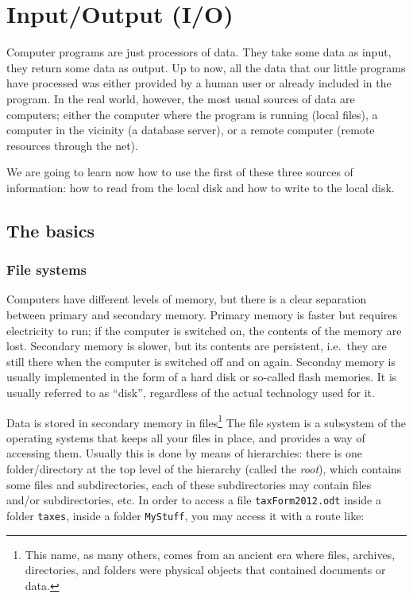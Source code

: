 
\section{Input/Output (I/O)}
\label{sec:inputoutput-io}

Computer programs are just processors of data. They take some data as
input, they return some data as output. Up to now, all the data that
our little programs have processed was either provided by a human user
or already included in the program. In the real world, however, the
most usual sources of data are computers; either the computer where
the program is running (local files), a computer in the vicinity (a
database server), or a remote computer (remote resources through the
net). 

We are going to learn now how to use the first of these three sources
of information: how to read from the local disk and how to write to
the local disk. 

\subsection{The basics}
\label{sec:basics}

\subsubsection{File systems}
\label{sec:filesystems}

Computers have different levels of memory, but there is a clear
separation between primary and secondary memory. Primary memory is
faster but requires electricity to run; if the computer is switched
on, the contents of the memory are lost. Secondary memory is slower,
but its contents are persistent, i.e.~they are still there when the
computer is switched off and on again. Seconday memory is usually
implemented in the form of a hard disk or so-called flash
memories. It is usually referred to as ``disk'', regardless of the
actual technology used for it. 

Data is stored in secondary memory in files\footnote{This name, as
  many others, comes from an ancient era where files, archives,
  directories, and folders were physical objects that contained
  documents or data.}  
The file system is a subsystem of the operating
systems that keeps all your files in place, and provides a way of
accessing them. Usually this is done by means of hierarchies: there is
one folder/directory at the top level of the hierarchy (called the
\emph{root}), which contains some files and subdirectories, each of
these subdirectories may contain files and/or subdirectories, etc. In
order to access a file \verb+taxForm2012.odt+ inside a folder
\verb+taxes+, inside a folder \verb+MyStuff+, you may access it with a
route like: 

